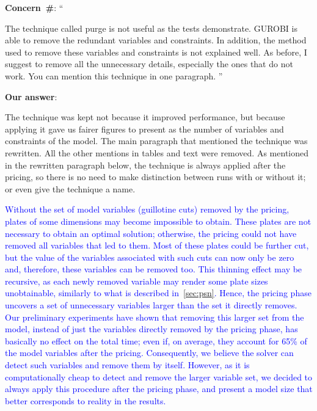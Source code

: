 \documentclass[smallextended]{svjour3}       %
\makeatletter
\newif\iffinalversion
\newcommand{\newtext}[1]{\iffinalversion%
#1%
\else%
\textcolor{blue}{#1}%
\fi%
}
\newcommand\gobblepars{%
    \@ifnextchar\par%
        {\expandafter\gobblepars\@gobble}%
        {}}
\newcounter{concern}
\newenvironment{concern}{%
    \refstepcounter{concern}\par\smallskip\noindent%
    \textbf{Concern~\#\theconcern}: ``\itshape\gobblepars}%
    {\unskip''\smallskip}
\newcounter{answer}
\newenvironment{answer}{%
    \refstepcounter{answer}\par\smallskip\noindent%
    \textbf{Our answer}: \gobblepars}%
    {\unskip\bigskip}
\makeatother
\begin{document}
\begin{concern}
The technique called purge is not useful as the tests demonstrate. GUROBI is able to remove the redundant variables and constraints. In addition, the method used to remove these variables and constraints is not explained well. As before, I suggest to remove all the unnecessary details, especially the ones that do not work. You can mention this technique in one paragraph.
\end{concern}
\begin{answer}
The technique was kept not because it improved performance, but because applying it gave us fairer figures to present as the number of variables and constraints of the model. The main paragraph that mentioned the technique was rewritten. All the other mentions in tables and text were removed. As mentioned in the rewritten paragraph below, the technique is always applied after the pricing, so there is no need to make distinction between runs with or without it; or even give the technique a name.

\newtext{Without the set of model variables (guillotine cuts) removed by the pricing, plates of some dimensions may become impossible to obtain. These plates are not necessary to obtain an optimal solution; otherwise, the pricing could not have removed all variables that led to them. Most of these plates could be further cut, but the value of the variables associated with such cuts can now only be zero and, therefore, these variables can be removed too. This thinning effect may be recursive, as each newly removed variable may render some plate sizes unobtainable, similarly to what is described in~\autoref{sec:psn}. Hence, the pricing phase uncovers a set of unnecessary variables larger than the set it directly removes. Our preliminary experiments have shown that removing this larger set from the model, instead of just the variables directly removed by the pricing phase, has basically no effect on the total time; even if, on average, they account for 65\% of the model variables after the pricing. Consequently, we believe the solver can detect such variables and remove them by itself. However, as it is computationally cheap to detect and remove the larger variable set, we decided to always apply this procedure after the pricing phase, and present a model size that better corresponds to reality in the results.}
\end{answer}
\end{document}
